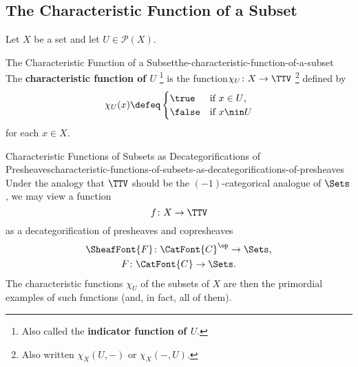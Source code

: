 \subsection{The Characteristic Function of a Subset}\label{subsection-the-characteristic-function-of-a-subset}
Let $X$ be a set and let $U\in\mathcal{P}(X)$.
\begin{definition}{The Characteristic Function of a Subset}{the-characteristic-function-of-a-subset}%
    The \textbf{characteristic function of $U$}%
    \footnote{%
        Also called the \textbf{indicator function of $U$}.
    } %
    is the function$\chi_{U}\colon X\to\TTV$%
    \footnote{%
        Also written $\chi_{X}(U,-)$ or $\chi_{X}(-,U)$.
        \par\vspace*{\TCBBoxCorrection}
    } %
    defined by
    \[
        \chi_{U}(x)
        \defeq
        \begin{cases}
            \true  &\text{if $x\in U$,}\\
            \false &\text{if $x\nin U$}
        \end{cases}
    \]%
    for each $x\in X$.
\end{definition}
\begin{remark}{Characteristic Functions of Subsets as Decategorifications of Presheaves}{characteristic-functions-of-subsets-as-decategorifications-of-presheaves}%
    Under the analogy that $\TTV$ should be the $(-1)$-categorical analogue of $\Sets$, we may view a function
    \[
        f\colon X\to\TTV%
    \]%
    as a decategorification of presheaves and copresheaves%
    \begin{gather*}
        \SheafFont{F} \colon \CatFont{C}^{\op} \to \Sets,\\%
        F             \colon \CatFont{C}       \to \Sets.%
    \end{gather*}
    The characteristic functions $\chi_{U}$ of the subsets of $X$ are then the primordial examples of such functions (and, in fact, all of them).
\end{remark}
